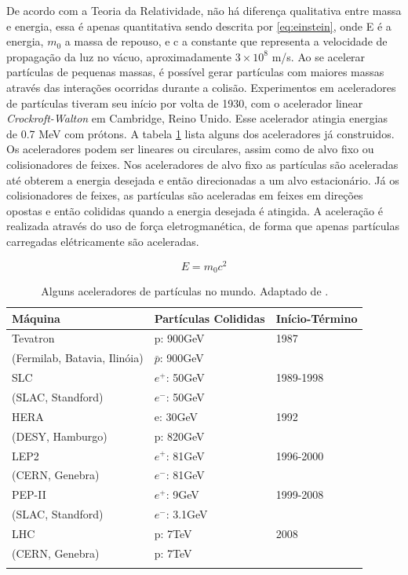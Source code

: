 De acordo com a Teoria da Relatividade, não há diferença qualitativa entre
massa e energia, essa é apenas quantitativa \cite{einstein} sendo descrita por
\ref{eq:einstein}, onde E é a energia, $m_0$ a massa de repouso, e c a constante que representa a
velocidade de propagação da luz no vácuo, aproximadamente $3\times 10^{8}$ m/s. Ao se acelerar
partículas de pequenas massas, é possível gerar partículas com maiores massas
através das interações ocorridas durante a colisão. Experimentos em
aceleradores de partículas tiveram seu início por volta de 1930, com o
acelerador linear \emph{Crockroft-Walton} em Cambridge, Reino Unido. Esse
acelerador atingia energias de 0.7 MeV com prótons. A tabela
\ref{tab:aceleradores} lista alguns dos aceleradores já construidos. Os
aceleradores podem ser lineares ou circulares, assim como de alvo fixo ou colisionadores
de feixes. Nos aceleradores de alvo fixo as partículas são aceleradas até
obterem a energia desejada e então direcionadas a um alvo estacionário. Já os
colisionadores de feixes, as partículas são aceleradas em feixes em direções
opostas e então colididas quando a energia desejada é atingida. A aceleração é
realizada através do uso de força eletrogmanética, de forma que apenas
partículas carregadas elétricamente são aceleradas.

\begin{equation} \label{eq:einstein}
E=m_0c^2
\end{equation}

\begin{table}
\centering
\begin{tabular}{lll}
\hline \hline \hline
\textbf{Máquina} & \textbf{Partículas Colididas} & \textbf{Início-Término} \\
\hline \hline
Tevatron & p: 900GeV & 1987 \\
(Fermilab, Batavia, Ilinóia) & $\bar{p}$: 900GeV & \\
\hline
SLC & $e^{+}$: 50GeV & 1989-1998 \\
(SLAC, Standford) & $e^{-}$: 50GeV & \\
\hline
HERA & e: 30GeV & 1992 \\
(DESY, Hamburgo) & p: 820GeV & \\
\hline
LEP2 & $e^{+}$: 81GeV & 1996-2000 \\
(CERN, Genebra) & $e^{-}$: 81GeV & \\
\hline
PEP-II & $e^{+}$: 9GeV & 1999-2008 \\
(SLAC, Standford) & $e^{-}$: 3.1GeV & \\
\hline
LHC & p: 7TeV & 2008 \\
(CERN, Genebra) & p: 7TeV & \\
\hline \hline
\label{tab:aceleradores}
\end{tabular}
\caption{Alguns aceleradores de partículas no mundo. Adaptado de \cite{Intro_Standard}.}
\end{table}

